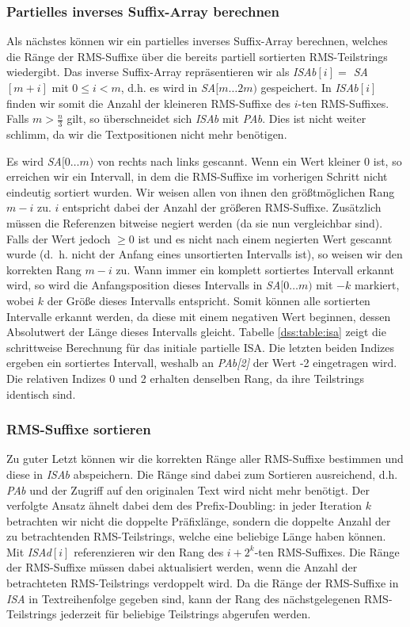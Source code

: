 \subsubsection{Partielles inverses Suffix-Array berechnen}
Als nächstes können wir ein partielles inverses Suffix-Array berechnen, welches die Ränge der RMS-Suffixe über die bereits partiell sortierten RMS-Teilstrings wiedergibt. Das inverse Suffix-Array repräsentieren wir als \textit{ISAb$[i] = $ SA $[m + i]$} mit $0 \leq i < m$, d.h. es wird in \textit{SA$[m\dots 2m)$} gespeichert. In \textit{ISAb$[i]$} finden wir somit die Anzahl der kleineren RMS-Suffixe des $i$-ten RMS-Suffixes. Falls $m > \frac{n}{3}$ gilt, so überschneidet sich \textit{ISAb} mit \textit{PAb}. Dies ist nicht weiter schlimm, da wir die Textpositionen nicht mehr benötigen.

Es wird \textit{SA$[0\dots m)$} von rechts nach links gescannt. Wenn ein Wert kleiner 0 ist, so erreichen wir ein Intervall, in dem die RMS-Suffixe im vorherigen Schritt nicht eindeutig sortiert wurden. Wir weisen allen von ihnen den größtmöglichen Rang $m-i$ zu. $i$ entspricht dabei der Anzahl der größeren RMS-Suffixe. Zusätzlich müssen die Referenzen bitweise negiert werden (da sie nun \glqq vergleichbar\grqq{} sind). Falls der Wert jedoch $\geq 0$ ist und es nicht nach einem negierten Wert gescannt wurde (d.~h. nicht der Anfang eines unsortierten Intervalls ist), so weisen wir den korrekten Rang $m-i$ zu. Wann immer ein komplett sortiertes Intervall erkannt wird, so wird die Anfangsposition dieses Intervalls in \textit{SA$[0\dots m)$} mit $-k$ markiert, wobei $k$ der Größe dieses Intervalls entspricht. Somit können alle sortierten Intervalle erkannt werden, da diese mit einem negativen Wert beginnen, dessen Absolutwert der Länge dieses Intervalls gleicht. Tabelle \ref{dss:table:isa} zeigt die schrittweise Berechnung für das initiale partielle ISA. Die letzten beiden Indizes ergeben ein sortiertes Intervall, weshalb an \textit{PAb[2]} der Wert -2 eingetragen wird. Die relativen Indizes 0 und 2 erhalten denselben Rang, da ihre Teilstrings identisch sind.


\subsubsection{RMS-Suffixe sortieren}
Zu guter Letzt können wir die korrekten Ränge aller RMS-Suffixe bestimmen und diese in \textit{ISAb} abspeichern. Die Ränge sind dabei zum Sortieren ausreichend, d.h. \textit{PAb} und der Zugriff auf den originalen Text wird nicht mehr benötigt. Der verfolgte Ansatz ähnelt dabei dem des Prefix-Doubling: in jeder Iteration $k$ betrachten wir nicht die doppelte Präfixlänge, sondern die doppelte Anzahl der zu betrachtenden RMS-Teilstrings, welche eine beliebige Länge haben können. Mit \textit{ISAd$[i]$} referenzieren wir den Rang des $i + 2^k$-ten RMS-Suffixes. Die Ränge der RMS-Suffixe müssen dabei aktualisiert werden, wenn die Anzahl der betrachteten RMS-Teilstrings verdoppelt wird. Da die Ränge der RMS-Suffixe in \textit{ISA} in Textreihenfolge gegeben sind, kann der Rang des nächstgelegenen RMS-Teilstrings jederzeit für beliebige Teilstrings abgerufen werden.

